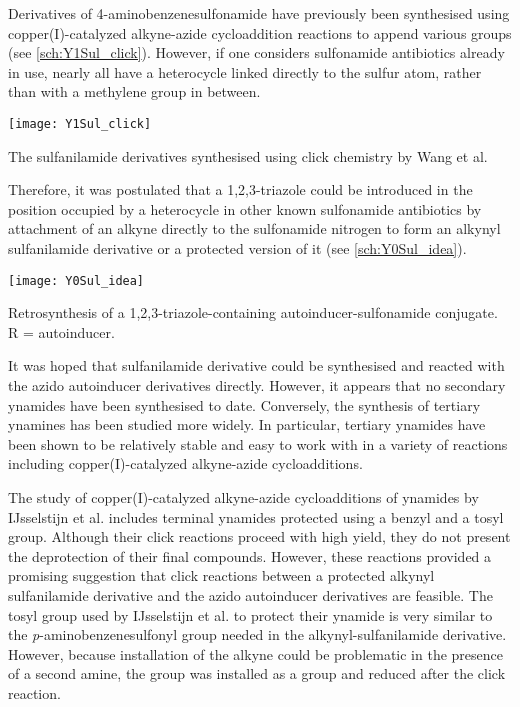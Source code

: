 Derivatives of 4-aminobenzenesulfonamide  have previously been synthesised using copper(I)-catalyzed alkyne-azide cycloaddition reactions to append various groups\cite{Wang2010} (see \ref{sch:Y1Sul_click}). However, if one considers sulfonamide antibiotics already in use, nearly all have a heterocycle linked directly to the sulfur atom, rather than with a methylene group in between. 

\begin{scheme}[H]
	\begin{center}
		\texttt{[image: Y1Sul\_click]}
		\caption{The sulfanilamide derivatives synthesised using click chemistry by Wang et al\cite{Wang2010}.
		\label{sch:Y1Sul_click}}
	\end{center}
\end{scheme}


Therefore, it was postulated that a 1,2,3-triazole could be introduced in the position occupied by a heterocycle in other known sulfonamide antibiotics by attachment of an alkyne directly to the sulfonamide nitrogen to form an alkynyl sulfanilamide derivative  or a protected version of it (see \ref{sch:Y0Sul_idea}).

\begin{scheme}[H]
	\begin{center}
		\texttt{[image: Y0Sul\_idea]}
		\caption{Retrosynthesis of a 1,2,3-triazole-containing autoinducer-sulfonamide conjugate. R = autoinducer.
		\label{sch:Y0Sul_idea}}
	\end{center}
\end{scheme}

It was hoped that sulfanilamide derivative  could be synthesised and reacted with the azido autoinducer derivatives directly. However, it appears that no secondary ynamides have been synthesised to date.
Conversely, the synthesis of tertiary ynamines has been studied more widely\cite{Ficini1976}. In particular, tertiary ynamides have been shown to be relatively stable and easy to work with in a variety of reactions including copper(I)-catalyzed alkyne-azide cycloadditions\cite{IJsselstijn2006,Evano2010}. 

The study of copper(I)-catalyzed alkyne-azide cycloadditions of ynamides by IJsselstijn et al.\cite{IJsselstijn2006} includes terminal ynamides protected using a benzyl and a tosyl group. Although their click reactions proceed with high yield, they do not present the deprotection of their final compounds. However, these reactions provided a promising suggestion that click reactions between a protected alkynyl sulfanilamide derivative and the azido autoinducer derivatives are feasible. The tosyl group used by IJsselstijn et al.\cite{IJsselstijn2006} to protect their ynamide is very similar to the \textit{p}-aminobenzenesulfonyl group needed in the alkynyl-sulfanilamide derivative. 
However, because installation of the alkyne could be problematic in the presence of a second amine, the  group was installed as a  group and reduced after the click reaction. 

